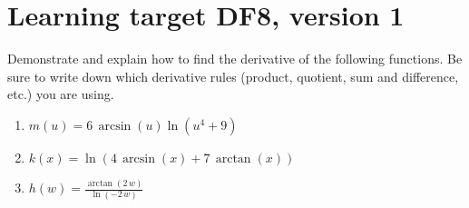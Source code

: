 \section{Learning target DF8, version 1}
\providecommand{\stxKnowl}{}\renewcommand{\stxKnowl}[1]{#1}
\providecommand{\stxOuttro}{}\renewcommand{\stxOuttro}[1]{#1}
\providecommand{\stxTitle}{}\renewcommand{\stxTitle}[1]{#1}
\renewcommand{\stxOuttro}[1]{}
\stxKnowl{
 Demonstrate and explain how to find the derivative of the following functions. Be sure to write down which derivative rules (product, quotient, sum and difference, etc.) you are using.

\begin{enumerate}
\item
\stxKnowl{
\(\renewcommand{\log}{\ln} m(u)= 6 \, \arcsin\left(u\right) \log\left(u^{4} + 9\right)\)

\stxOuttro{
\(\renewcommand{\log}{\ln} m' (u)= \frac{24 \, u^{3} \arcsin\left(u\right)}{u^{4} + 9} + \frac{6 \, \log\left(u^{4} + 9\right)}{\sqrt{-u^{2} + 1}}\)

}
}
\vfill
\item
\stxKnowl{
\(\renewcommand{\log}{\ln} k(x)= \log\left(4 \, \arcsin\left(x\right) + 7 \, \arctan\left(x\right)\right)\)

\stxOuttro{
\[\renewcommand{\log}{\ln} k' (x)= \frac{\frac{4}{\sqrt{-x^{2} + 1}} + \frac{7}{x^{2} + 1}}{4 \, \arcsin\left(x\right) + 7 \, \arctan\left(x\right)}\]

}
}
\vfill
\item
\stxKnowl{
\(\renewcommand{\log}{\ln} h(w)= \frac{\arctan\left(2 \, w\right)}{\log\left(-2 \, w\right)}\)

\stxOuttro{
\(\renewcommand{\log}{\ln} h' (w)= -\frac{\arctan\left(2 \, w\right)}{w \log\left(-2 \, w\right)^{2}} + \frac{2}{{\left(4 \, w^{2} + 1\right)} \log\left(-2 \, w\right)}\)

}
}
\vfill
\end{enumerate}
}



